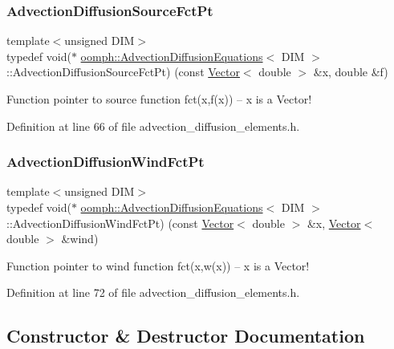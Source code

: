 \subsubsection{\texorpdfstring{Advection\+Diffusion\+Source\+Fct\+Pt}{AdvectionDiffusionSourceFctPt}}
{\footnotesize\ttfamily template$<$unsigned D\+IM$>$ \\
typedef void($\ast$ \hyperlink{classoomph_1_1AdvectionDiffusionEquations}{oomph\+::\+Advection\+Diffusion\+Equations}$<$ D\+IM $>$\+::Advection\+Diffusion\+Source\+Fct\+Pt) (const \hyperlink{classoomph_1_1Vector}{Vector}$<$ double $>$ \&x, double \&f)}



Function pointer to source function fct(x,f(x)) -- x is a Vector! 



Definition at line 66 of file advection\+\_\+diffusion\+\_\+elements.\+h.

\mbox{\label{classoomph_1_1AdvectionDiffusionEquations_a341db90b2eaf704f3286a9fcde7c614a}} 
\subsubsection{\texorpdfstring{Advection\+Diffusion\+Wind\+Fct\+Pt}{AdvectionDiffusionWindFctPt}}
{\footnotesize\ttfamily template$<$unsigned D\+IM$>$ \\
typedef void($\ast$ \hyperlink{classoomph_1_1AdvectionDiffusionEquations}{oomph\+::\+Advection\+Diffusion\+Equations}$<$ D\+IM $>$\+::Advection\+Diffusion\+Wind\+Fct\+Pt) (const \hyperlink{classoomph_1_1Vector}{Vector}$<$ double $>$ \&x, \hyperlink{classoomph_1_1Vector}{Vector}$<$ double $>$ \&wind)}



Function pointer to wind function fct(x,w(x)) -- x is a Vector! 



Definition at line 72 of file advection\+\_\+diffusion\+\_\+elements.\+h.



\subsection{Constructor \& Destructor Documentation}
\mbox{\label{classoomph_1_1AdvectionDiffusionEquations_a29a6689bdcd6f14bc30bbeaa6e7ccafe}} 
